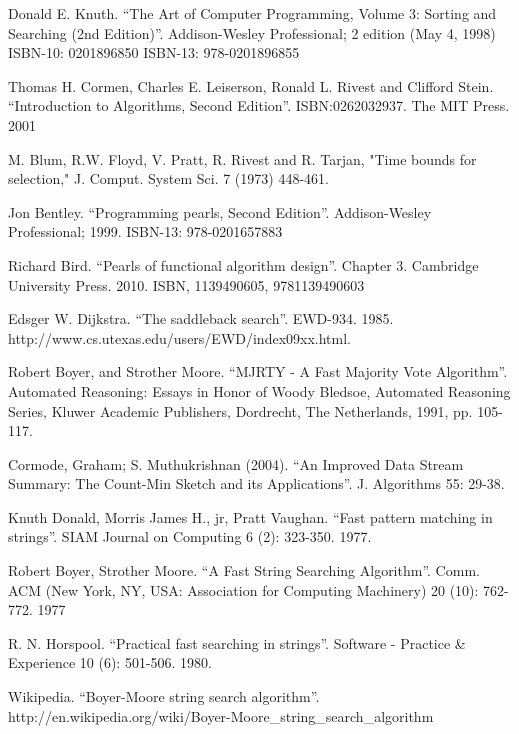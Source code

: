 \documentclass[UTF8]{article}
\begin{document}
\begin{thebibliography}{99}

Donald E. Knuth. ``The Art of Computer Programming, Volume 3: Sorting and Searching (2nd Edition)''. Addison-Wesley Professional; 2 edition (May 4, 1998) ISBN-10: 0201896850 ISBN-13: 978-0201896855

Thomas H. Cormen, Charles E. Leiserson, Ronald L. Rivest and Clifford Stein.
``Introduction to Algorithms, Second Edition''. ISBN:0262032937. The MIT Press. 2001

M. Blum, R.W. Floyd, V. Pratt, R. Rivest and R. Tarjan, "Time bounds for selection," J. Comput. System Sci. 7 (1973) 448-461.

Jon Bentley. ``Programming pearls, Second Edition''. Addison-Wesley Professional; 1999. ISBN-13: 978-0201657883

Richard Bird. ``Pearls of functional algorithm design''. Chapter 3. Cambridge University Press. 2010. ISBN, 1139490605, 9781139490603

Edsger W. Dijkstra. ``The saddleback search''. EWD-934. 1985. http://www.cs.utexas.edu/users/EWD/index09xx.html.

Robert Boyer, and Strother Moore. ``MJRTY - A Fast Majority Vote Algorithm''. Automated Reasoning: Essays in Honor of Woody Bledsoe, Automated Reasoning Series, Kluwer Academic Publishers, Dordrecht, The Netherlands, 1991, pp. 105-117.

Cormode, Graham; S. Muthukrishnan (2004). ``An Improved Data Stream Summary: The Count-Min Sketch and its Applications''. J. Algorithms 55: 29-38.

Knuth Donald, Morris James H., jr, Pratt Vaughan. ``Fast pattern matching in strings''. SIAM Journal on Computing 6 (2): 323-350. 1977.

Robert Boyer, Strother Moore. ``A Fast String Searching Algorithm''. Comm. ACM (New York, NY, USA: Association for Computing Machinery) 20 (10): 762-772. 1977

R. N. Horspool. ``Practical fast searching in strings''. Software - Practice \& Experience 10 (6): 501-506. 1980.

Wikipedia. ``Boyer-Moore string search algorithm''. http://en.wikipedia.org/wiki/Boyer-Moore\_string\_search\_algorithm


\end{thebibliography}
\end{document}
